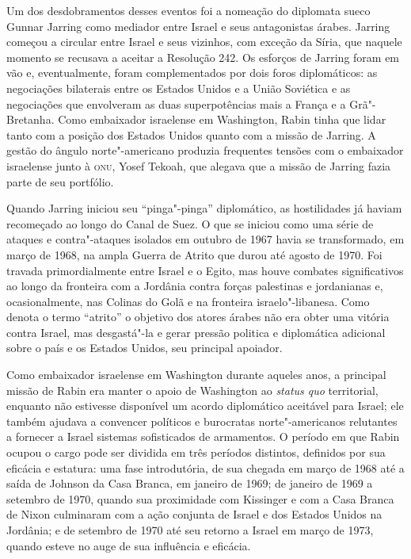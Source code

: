 Um dos desdobramentos desses eventos foi a nomeação do diplomata sueco
Gunnar Jarring como mediador entre Israel e seus antagonistas árabes.
Jarring começou a circular entre Israel e seus vizinhos, com exceção da
Síria, que naquele momento se recusava a aceitar a Resolução 242. Os
esforços de Jarring foram em vão e, eventualmente, foram complementados
por dois foros diplomáticos: as negociações bilaterais entre os Estados
Unidos e a União Soviética e as negociações que envolveram as duas
superpotências mais a França e a Grã"-Bretanha. Como embaixador
israelense em Washington, Rabin tinha que lidar tanto com a posição dos
Estados Unidos quanto com a missão de Jarring. A gestão do ângulo norte"-americano
produzia frequentes tensões com o embaixador israelense junto à \textsc{onu},
Yosef Tekoah, que alegava que a missão de Jarring fazia parte de seu
portfólio.

Quando Jarring iniciou seu ``pinga"-pinga'' diplomático, as hostilidades
já haviam recomeçado ao longo do Canal de Suez. O que se iniciou como
uma série de ataques e contra"-ataques isolados em outubro de 1967 havia
se transformado, em março de 1968, na ampla Guerra de Atrito que
durou até agosto de 1970. Foi travada primordialmente entre Israel e o
Egito, mas houve combates significativos ao longo da fronteira com a
Jordânia contra forças palestinas e jordanianas e, ocasionalmente, nas
Colinas do Golã e na fronteira israelo"-libanesa. Como denota o termo
``atrito'' o objetivo dos atores árabes não era obter uma vitória contra
Israel, mas desgastá"-la e gerar pressão politica e diplomática adicional
sobre o país e os Estados Unidos, seu principal apoiador.

Como embaixador israelense em Washington durante aqueles anos, a
principal missão de Rabin era manter o apoio de Washington ao
\emph{status quo} territorial, enquanto não estivesse disponível um
acordo diplomático aceitável para Israel; ele também ajudava a convencer
políticos e burocratas norte"-americanos relutantes a fornecer a Israel
sistemas sofisticados de armamentos. O período em que Rabin ocupou o cargo pode ser
dividida em três períodos distintos, definidos por sua eficácia e
estatura: uma fase introdutória, de sua chegada em março de 1968 até a
saída de Johnson da Casa Branca, em janeiro de 1969; de janeiro de 1969 a
setembro de 1970, quando sua proximidade com Kissinger e com a Casa
Branca de Nixon culminaram com a ação conjunta de Israel e dos Estados Unidos na
Jordânia; e de setembro de 1970 até seu retorno a Israel em março de
1973, quando esteve no auge de sua influência e eficácia.

